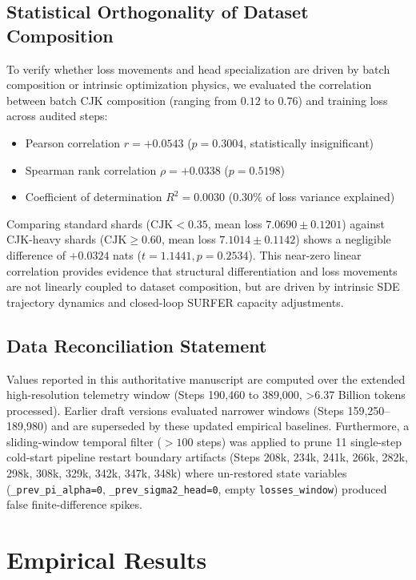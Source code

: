 \documentclass[11pt,twocolumn]{article}
\begin{document}
\subsection{Statistical Orthogonality of Dataset Composition}
To verify whether loss movements and head specialization are driven by batch composition or intrinsic optimization physics, we evaluated the correlation between batch CJK composition (ranging from $0.12$ to $0.76$) and training loss across audited steps:
\begin{itemize}
\item Pearson correlation $r = +0.0543$ ($p = 0.3004$, statistically insignificant)
\item Spearman rank correlation $\rho = +0.0338$ ($p = 0.5198$)
\item Coefficient of determination $R^2 = 0.0030$ ($0.30\%$ of loss variance explained)
\end{itemize}

Comparing standard shards ($\text{CJK} < 0.35$, mean loss $7.0690 \pm 0.1201$) against CJK-heavy shards ($\text{CJK} \ge 0.60$, mean loss $7.1014 \pm 0.1142$) shows a negligible difference of $+0.0324$ nats ($t = 1.1441, p = 0.2534$). This near-zero linear correlation provides evidence that structural differentiation and loss movements are not linearly coupled to dataset composition, but are driven by intrinsic SDE trajectory dynamics and closed-loop SURFER capacity adjustments.

\subsection{Data Reconciliation Statement}
Values reported in this authoritative manuscript are computed over the extended high-resolution telemetry window (Steps 190,460 to 389,000, >6.37 Billion tokens processed). Earlier draft versions evaluated narrower windows (Steps 159,250--189,980) and are superseded by these updated empirical baselines. Furthermore, a sliding-window temporal filter ($>100$ steps) was applied to prune 11 single-step cold-start pipeline restart boundary artifacts (Steps 208k, 234k, 241k, 266k, 282k, 298k, 308k, 329k, 342k, 347k, 348k) where un-restored state variables (\texttt{\_prev\_pi\_alpha=0}, \texttt{\_prev\_sigma2\_head=0}, empty \texttt{losses\_window}) produced false finite-difference spikes.

\section{Empirical Results}
\end{document}

